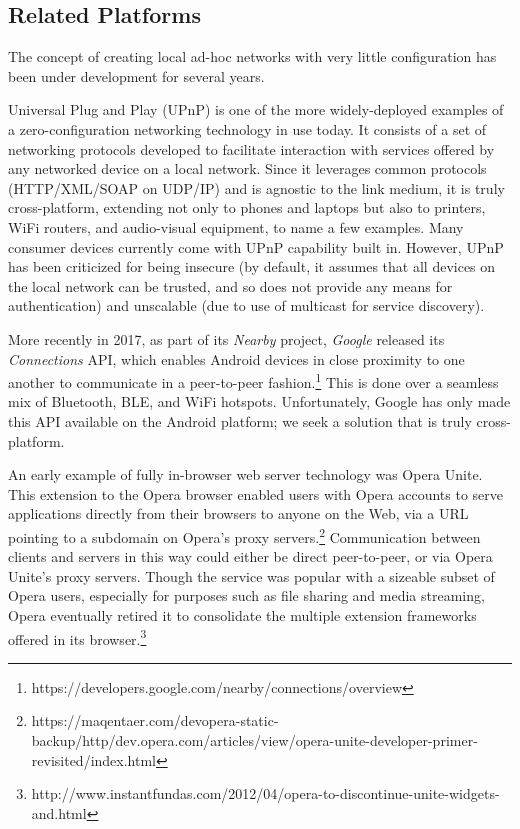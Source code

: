 \subsection{Related Platforms}
\label{sec:related_platforms}

The concept of creating local ad-hoc networks with very little configuration has been under development for several years.

Universal Plug and Play (UPnP) is one of the more widely-deployed examples of a zero-configuration networking technology in use today. 
It consists of a set of networking protocols developed to facilitate interaction with services offered by any networked device on a local network.
Since it leverages common protocols (HTTP/XML/SOAP on UDP/IP) and is agnostic to the link medium, it is truly cross-platform, extending not only to phones and laptops but also to printers, WiFi routers, and audio-visual equipment, to name a few examples.
Many consumer devices currently come with UPnP capability built in.
However, UPnP has been criticized for being insecure (by default, it assumes that all devices on the local network can be trusted, and so does not provide any means for authentication) and unscalable (due to use of multicast for service discovery).

More recently in 2017, as part of its \textit{Nearby} project, \textit{Google} released its \textit{Connections} API, which enables Android devices in close proximity to one another to communicate in a peer-to-peer fashion.\footnote{https://developers.google.com/nearby/connections/overview}
This is done over a seamless mix of Bluetooth, BLE, and WiFi hotspots.
Unfortunately, Google has only made this API available on the Android platform; we seek a solution that is truly cross-platform.

An early example of fully in-browser web server technology was Opera Unite.
This extension to the Opera browser enabled users with Opera accounts to serve applications directly from their browsers to anyone on the Web, via a URL pointing to a subdomain on Opera's proxy servers.\footnote{https://maqentaer.com/devopera-static-backup/http/dev.opera.com/articles/view/opera-unite-developer-primer-revisited/index.html}
Communication between clients and servers in this way could either be direct peer-to-peer, or via Opera Unite's proxy servers.
Though the service was popular with a sizeable subset of Opera users, especially for purposes such as file sharing and media streaming, Opera eventually retired it to consolidate the multiple extension frameworks offered in its browser.\footnote{http://www.instantfundas.com/2012/04/opera-to-discontinue-unite-widgets-and.html}

